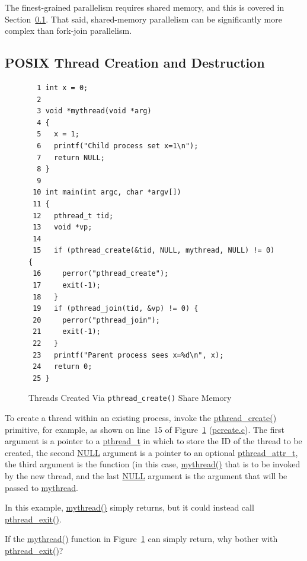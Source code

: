 The finest-grained parallelism requires shared memory, and
this is covered in
Section~\ref{sec:toolsoftrade:POSIX Thread Creation and Destruction}.
That said, shared-memory parallelism can be significantly more complex
than fork-join parallelism.

\subsection{POSIX Thread Creation and Destruction}
\label{sec:toolsoftrade:POSIX Thread Creation and Destruction}

\begin{figure}[tbp]
{ \scriptsize
\begin{verbatim}
  1 int x = 0;
  2 
  3 void *mythread(void *arg)
  4 {
  5   x = 1;
  6   printf("Child process set x=1\n");
  7   return NULL;
  8 }
  9 
 10 int main(int argc, char *argv[])
 11 {
 12   pthread_t tid;
 13   void *vp;
 14 
 15   if (pthread_create(&tid, NULL, mythread, NULL) != 0) {
 16     perror("pthread_create");
 17     exit(-1);
 18   }
 19   if (pthread_join(tid, &vp) != 0) {
 20     perror("pthread_join");
 21     exit(-1);
 22   }
 23   printf("Parent process sees x=%d\n", x);
 24   return 0;
 25 }
\end{verbatim}
}
\caption{Threads Created Via {\tt pthread\_create()} Share Memory}
\label{fig:toolsoftrade:Threads Created Via pthread-create() Share Memory}
\end{figure}

To create a thread within an existing process, invoke the
\url{pthread_create()} primitive, for example, as shown on line~15 of
Figure~\ref{fig:toolsoftrade:Threads Created Via pthread-create() Share Memory}
(\url{pcreate.c}).
The first argument is a pointer to a \url{pthread_t} in which to store the
ID of the thread to be created, the second \url{NULL} argument is a pointer
to an optional \url{pthread_attr_t}, the third argument is the function
(in this case, \url{mythread()}
that is to be invoked by the new thread, and the last \url{NULL} argument
is the argument that will be passed to \url{mythread}.

In this example, \url{mythread()} simply returns, but it could instead
call \url{pthread_exit()}.

\QuickQuiz{}
	If the \url{mythread()} function in
	Figure~\ref{fig:toolsoftrade:Threads Created Via pthread-create() Share Memory}
	can simply return, why bother with \url{pthread_exit()}?
 \QuickQuizEnd

